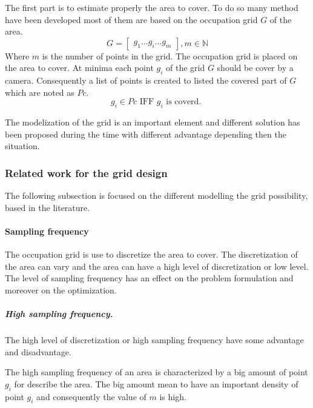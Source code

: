
The first part is to estimate properly the area to cover. To do so many method have been developed most of them are based on the occupation grid $G$ of the area. 
\begin{equation}\label{eq:Grid}
	G=\begin{bmatrix}
	 	g_1 ...g_i ... g_m
	\end{bmatrix}  , m\in \mathbb{N}
\end{equation}
Where $m$ is the number of points in the grid.
The occupation grid is placed on the area to cover. At minima each point $g_i$ of the grid $G$ should be cover by a camera. Consequently a list of points is created to listed the covered part of $G$ which are noted as $Pc$.
\begin{equation}\label{eq:Pci}
g_i \in Pc \mbox{ IFF } g_i \mbox{ is coverd. }
\end{equation}


The modelization of the grid is an important element and different solution has been proposed during the time with different advantage depending then the situation.\\

\subsubsection*{Related work for the grid design}
The following subsection is focused on the different  modelling the grid possibility, based in the literature. 

\paragraph*{Sampling frequency} %
The occupation grid is use to discretize the area to cover. The discretization of the area can vary and the area can have a high level of discretization or low level. The level of sampling frequency has an effect on the problem formulation and moreover on the optimization.

\subparagraph{High sampling frequency.}
The high level of discretization or high sampling frequency have some advantage and disadvantage.
 
The high sampling frequency of an area is characterized by a big amount of point $g_i$ for describe the area. The big amount mean to have an important density of point $g_i$ and consequently the value of $m$ is high. 

